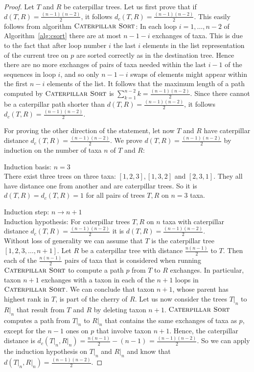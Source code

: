 \documentclass{amsart}
\newcommand{\csort}{\textsc{Caterpillar Sort}}
\begin{document}
\begin{proof}
Let $T$ and $R$ be caterpillar trees.
Let us first prove that if $d(T,R) = \frac{(n-1)(n-2)}{2}$, it follows $d_c(T,R) = \frac{(n-1)(n-2)}{2}$.
This easily follows from algorithm $\csort$:
In each loop $i=1, \ldots, n-2$ of Algorithm~\ref{alg:csort} there are at most $n-1-i$ exchanges of taxa.
This is due to the fact that after loop number $i$ the last $i$ elements in the list representation of the current tree on $p$ are sorted correctly as in the destination tree.
Hence there are no more exchanges of pairs of taxa needed within the last $i-1$ of the sequences in loop $i$, and so only $n-1-i$ swaps of elements might appear within the first $n-i$ elements of the list.
It follows that the maximum length of a path computed by $\csort$ is $\sum\limits_{k=1}^{n-2} k = \frac{(n-1)(n-2)}{2}$.
Since there cannot be a caterpillar path shorter than $d(T,R) = \frac{(n-1)(n-2)}{2}$, it follows $d_c(T,R) = \frac{(n-1)(n-2)}{2}$.

For proving the other direction of the statement, let now $T$ and $R$ have caterpillar distance $d_c(T,R) = \frac{(n-1)(n-2)}{2}$.
We prove $d(T,R) = \frac{(n-1)(n-2)}{2}$ by induction on the number of taxa $n$ of $T$ and $R$:

Induction basis: $n=3$\\
There exist three trees on three taxa: $[1,2,3], [1,3,2]$ and $[2,3,1]$.
They all have distance one from another and are caterpillar trees.
So it is $d(T,R) = d_c(T,R) = 1$ for all pairs of trees $T,R$ on $n=3$ taxa.

Induction step: $n \to n+1$\\
Induction hypothesis: For caterpillar trees $T, R$ on $n$ taxa with caterpillar distance $d_c(T,R) = \frac{(n-1)(n-2)}{2}$ it is $d(T,R) = \frac{(n-1)(n-2)}{2}$.\\
Without loss of generality we can assume that $T$ is the caterpillar tree $[1,2,3,\ldots,n+1]$.
Let $R$ be a caterpillar tree with distance $\frac{n(n-1)}{2}$ to $T$.
Then each of the $\frac{n(n-1)}{2}$ pairs of taxa that is considered when running $\csort$ to compute a path $p$ from $T$ to $R$ exchanges.
In particular, taxon $n+1$ exchanges with a taxon in each of the $n+1$ loops in $\csort$.
We can conclude that taxon $n+1$, whose parent has highest rank in $T$, is part of the cherry of $R$.
Let us now consider the trees $T{\big|}_n$ to $R{\big|}_n$ that result from $T$ and $R$ by deleting taxon $n+1$.
$\csort$ computes a path from $T{\big|}_n$ to $R{\big|}_n$ that contains the same exchanges of taxa as $p$, except for the $n-1$ ones on $p$ that involve taxon $n+1$.
Hence, the caterpillar distance is $d_c(T{\big|}_n, R{\big|}_n) = \frac{n(n-1)}{2} - (n-1)$ = $\frac{(n-1)(n-2)}{2}$.
So we can apply the induction hypothesis on $T{\big|}_n$ and $R{\big|}_n$ and know that $d(T{\big|}_n,R{\big|}_n) = \frac{(n-1)(n-2)}{2}$.


\end{proof}
\end{document}
